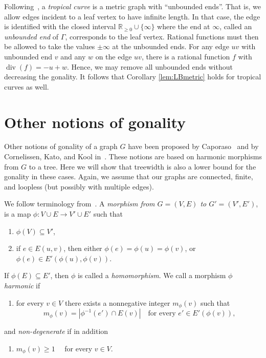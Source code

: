 \documentclass[ALCO,ThmDefs,Unicode,epreuves]{cedram}
\DeclareMathOperator{\todiv}{div}
\begin{document}
\begin{rema}
Following~\cite{gathmannkerber}, a \emph{tropical curve} is a metric graph with ``unbounded ends''. That is, we allow edges incident to a leaf vertex to have infinite length. In that case, the edge is identified with the closed interval $\mathbb{R}_{\geq 0}\cup\{\infty\}$ where the end at $\infty$, called an \emph{unbounded end} of $\Gamma$, corresponds to the leaf vertex. Rational functions must then be allowed to take the values $\pm \infty$ at the unbounded ends. For any edge $uv$ with unbounded end $v$ and any $w$ on the edge $uv$, there is a rational function $f$ with $\todiv(f)=-u+w$. Hence, we may remove all unbounded ends without decreasing the gonality. It follows that Corollary \ref{lem:LBmetric} holds for tropical curves as well.
\end{rema}




\section{Other notions of gonality}
Other notions of gonality of a graph $G$ have been proposed by Caporaso~\cite{Caporaso2012} and by Cornelissen, Kato, and Kool in~\cite{CornelissenKatoKool2012}. These notions are based on harmonic morphisms from $G$ to a tree. Here we will show that treewidth is also a lower bound for the gonality in these cases. Again, we assume that our graphs are connected, finite, and loopless (but possibly with multiple edges).

We follow terminology from~\cite{BakerNorine2009}.
A \emph{morphism from $G=(V,E)$ to $G'=(V',E')$}, is a map $\phi:V\cup E\to V'\cup E'$ such that 
\begin{enumerate}[label=(\roman*),series=morphism]
\item $\phi(V)\subseteq V'$,
\item if $e\in E(u,v)$, then either $\phi(e)=\phi(u)=\phi(v)$, or $\phi(e)\in E'(\phi(u),\phi(v))$.
\end{enumerate}
If $\phi(E)\subseteq E'$, then $\phi$ is called a \emph{homomorphism}. We call a morphism $\phi$ \emph{harmonic} if 
\begin{enumerate}[resume*=morphism]
\item for every $v\in V$ there exists a nonnegative integer $m_\phi(v)$ such that
\begin{equation}\label{harm}
m_\phi(v)=|\phi^{-1}(e')\cap E(v)|\quad\text{for every $e'\in E'(\phi(v))$,}
\end{equation}
\end{enumerate}
\noindent and \emph{non-degenerate} if in addition
\begin{enumerate}[resume*=morphism]
\item $m_\phi(v)\geq 1\quad$ for every $v\in V$.
\end{enumerate}
\end{document}
